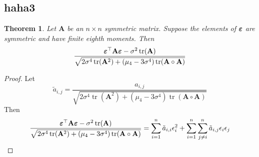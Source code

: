\documentclass[11pt]{article}
\DeclareMathOperator{\mytr}{tr}
\newcommand{\BA}{\mathbf{A}}    \newcommand{\BB}{\mathbf{B}}    \newcommand{\BC}{\mathbf{C}}    \newcommand{\BD}{\mathbf{D}}    \newcommand{\BE}{\mathbf{E}}    \newcommand{\BF}{\mathbf{F}}    \newcommand{\BG}{\mathbf{G}}    \newcommand{\BH}{\mathbf{H}}    \newcommand{\BI}{\mathbf{I}}    \newcommand{\BJ}{\mathbf{J}}    \newcommand{\BK}{\mathbf{K}}    \newcommand{\BL}{\mathbf{L}}
\theoremstyle{plain}
\newtheorem{theorem}{\quad\quad Theorem}
\theoremstyle{definition}
\theoremstyle{remark}
\begin{document}
\begin{appendices}
 

\section{haha3}
\begin{theorem}
    Let $\BA$ be an $n\times n$ symmetric matrix.
    Suppose the elements of $\boldsymbol{\varepsilon}$ are symmetric and have finite eighth moments.
    Then
    \begin{equation*}
        \frac{
            \bepsilon^\top \BA \bepsilon-\sigma^2 \mytr (\BA)
        }{
            \sqrt{
    2\sigma^4 \mytr(\BA^2)
    +
        (\mu_4-3\sigma^4)\mytr(\BA\circ \BA)
            }             
        }
    \end{equation*}
    \label{approximation}
\end{theorem}
\begin{proof}
    Let
    \begin{equation*}
        \tilde a_{i,j}=
        \frac{a_{i,j}}{
            \sqrt{
    2\sigma^4 \mytr(\BA^2)
    +
        (\mu_4-3\sigma^4)\mytr(\BA\circ \BA)
            }             
        }
    \end{equation*}
Then
    \begin{equation*}
        \frac{
            \bepsilon^\top \BA \bepsilon-\sigma^2 \mytr (\BA)
        }{
            \sqrt{
    2\sigma^4 \mytr(\BA^2)
    +
        (\mu_4-3\sigma^4)\mytr(\BA\circ \BA)
            }             
        }
        =\sum_{i=1}^n \tilde a_{i,i}\epsilon_i^2
    +\sum_{i=1}^n \sum_{j\neq i}^n \tilde a_{i,j} \epsilon_i \epsilon_j
    \end{equation*}



\end{proof}
\end{appendices}
\end{document}

